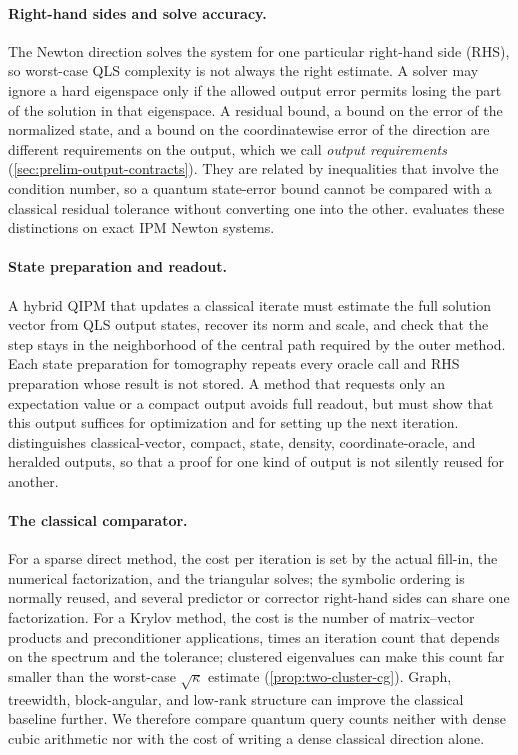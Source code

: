 \paragraph{Right-hand sides and solve accuracy.}
The Newton direction solves the system for one particular right-hand
side (RHS), so worst-case QLS complexity is not always the right estimate.
A solver may ignore a hard eigenspace only if the allowed
output error permits losing the part of the solution in that eigenspace.  A
residual bound, a bound on the error of the normalized state, and a bound on
the coordinatewise error of the direction are different requirements on the
output, which we call \emph{output requirements}
(\cref{sec:prelim-output-contracts}).  They are related by inequalities that
involve the condition number, so a quantum state-error bound cannot be
compared with a classical residual tolerance without converting one into the
other.   evaluates these distinctions on exact IPM
Newton systems.

\paragraph{State preparation and readout.}
A hybrid QIPM that updates a classical iterate must estimate the full
solution vector from QLS output states, recover its norm and
scale, and check that the step stays in the neighborhood of the central path
required by the outer method.  Each state preparation for tomography repeats
every oracle
call and RHS preparation whose result is not stored.  A method that requests
only an expectation value or a compact
output avoids full readout, but must show that this output suffices for
optimization and for setting up the next iteration.
 distinguishes classical-vector, compact,
state, density, coordinate-oracle, and heralded outputs, so that a proof for
one kind of output is not silently reused for another.

\paragraph{The classical comparator.}
For a sparse direct method, the cost per iteration is set by the actual
fill-in, the numerical factorization, and the triangular solves; the
symbolic ordering is normally reused, and several predictor or corrector
right-hand sides can share one factorization.  For a Krylov method, the cost
is the number of matrix--vector products and preconditioner applications,
times an iteration count that depends on the spectrum and the tolerance;
clustered eigenvalues can make this count far smaller than the worst-case
\(\sqrt\kappa\) estimate (\cref{prop:two-cluster-cg}).  Graph, treewidth,
block-angular, and low-rank structure can improve the classical baseline
further.  We therefore compare quantum query counts neither with dense cubic
arithmetic nor with the cost of writing a dense classical direction alone.

